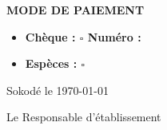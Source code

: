 \documentclass[a4paper, 12pt]{article}
\begin{document}
\textbf{MODE DE PAIEMENT} 
\begin{itemize}
  \item \textbf{Chèque : $\square$   \hspace{1cm} \textbf{Numéro :  } } 
  \item \textbf{Espèces : $\square$}
\end{itemize} 


\begin{flushright}
Sokodé le \today
\end{flushright}\vspace{2mm}


\begin{flushright}
Le Responsable d'établissement
\end{flushright}
\end{document}
